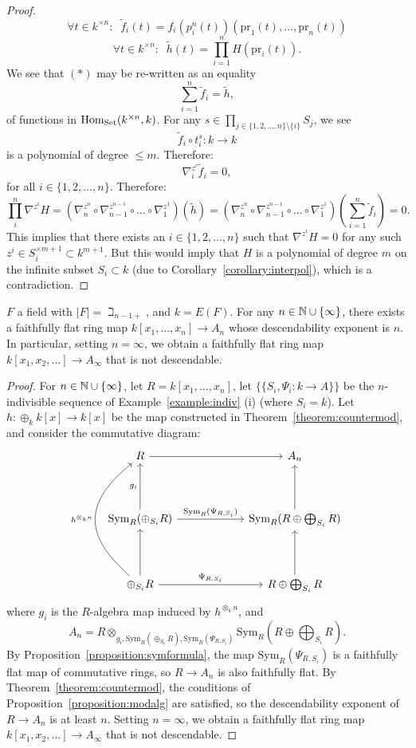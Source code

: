\begin{proof}
\[\forall t \in k^{\times n}: \; \; \tilde{f}_i(t) = f_i(p^n_i(t))(\text{pr}_1(t),...,\text{pr}_n(t))\]
\[\forall t \in k^{\times n}: \; \; \tilde{h}(t) = \prod_{i=1}^n H(\text{pr}_i(t)).\]
We see that $(*)$ may be re-written as an equality
\[\sum^n_{i=1} \tilde{f}_i = \tilde{h},\]
of functions in $\operatorname{Hom}_{\mathrm{Set}}(k^{\times n}, k)$. For any $s \in \prod_{j \in \{1,2,...,n\} \setminus \{i\}} S_j$, we see
\[\tilde{f}_i \circ t^{s}_i: k \to k\]
is a polynomial of degree $\le m$. Therefore:
\[\nabla^{z^i}_i \tilde{f}_i = 0,\]
for all $i \in \{1,2,...,n\}$. Therefore:
\[ \prod_i^n \nabla^{z^i} H = (\nabla^{z^n}_n \circ \nabla^{z^{n-1}}_{n-1} \circ ... \circ \nabla^{z^1}_1)( \tilde{h}) = (\nabla^{z^n}_n \circ \nabla^{z^{n-1}}_{n-1} \circ ... \circ \nabla^{z^1}_1)(\sum_{i=1}^n \tilde{f}_i)=0.\]
This implies that there exists an $i \in \{1,2,...,n\}$ such that $\nabla^{z^i} H = 0$ for any such $z^i \in S_i^{\times m+1} \subset k^{m+1}$. But this would imply that $H$ is a polynomial of degree $m$ on the infinite subset $S_i \subset k$ (due to Corollary~\ref{corollary:interpol}), which is a contradiction.
\end{proof}
\begin{theorem}\label{theorem:maincounter}
$F$ a field with $|F| = \beth_{n-1+}$, and $k=E(F)$. 
For any $n \in \mathbb{N} \cup \{\infty\}$, there exists a faithfully flat ring map $k[x_1,...,x_n] \to A_{n}$ 
whose descendability exponent is $n$. In particular, setting $n=\infty$, we obtain a faithfully flat ring map $k[x_1,x_2,...] \to A_{\infty}$ 
that is not descendable.
\end{theorem}
\begin{proof}
For $n \in \mathbb{N} \cup \{\infty\}$, let $R=k[x_1,...,x_n]$, let $\{\{S_i, \Psi_{i}: k \to A\}\}$ be the $n$-indivisible sequence of Example~\ref{example:indiv} (i) (where $S_i=k$). 
Let $h: \oplus_{k} k[x] \to k[x]$ be the map constructed in Theorem~\ref{theorem:countermod}, and consider the commutative diagram:
\[
\begin{tikzcd}[column sep=6em, row sep=4em]
R \arrow[r] & A_n \\
\mathrm{Sym}_{R}(\oplus_{S_i} R)
  \arrow[u, "g_i"', swap]
  \arrow[r, "\mathrm{Sym}_{R}(\Psi_{R,S_i})"]
& \mathrm{Sym}_{R}(R \oplus \bigoplus_{S_i} R)
  \arrow[u] \\
\oplus_{S_i} R
  \arrow[u]
  \arrow[uu, bend left=50, looseness=1.4, "h^{\otimes_{k} n}"', swap]
  \arrow[r, "\Psi_{R,S_i}"]
& R \oplus \bigoplus_{S_i} R
  \arrow[u]
\end{tikzcd}
\]
where $g_i$ is the $R$-algebra map induced by $h^{\otimes_{k} n}$, and 
\[A_n = R \otimes_{g_i,\mathrm{Sym}_{R}(\oplus_{S_i} R),\mathrm{Sym}_{R}(\Psi_{R,S_i})} \mathrm{Sym}_{R}(R \oplus \bigoplus_{S_i} R).\]
By Proposition~\ref{proposition:symformula}, the map $\mathrm{Sym}_{R}(\Psi_{R,S_i})$ is a faithfully flat map of commutative rings, 
so $R \to A_n$ is also faithfully flat. 
By Theorem~\ref{theorem:countermod}, the conditions of Proposition~\ref{proposition:modalg} are satisfied, so the 
descendability exponent of $R \to A_n$ is at least $n$. Setting $n=\infty$, we obtain a faithfully flat ring map $k[x_1,x_2,...] \to A_\infty$ that is not descendable.
\end{proof}



